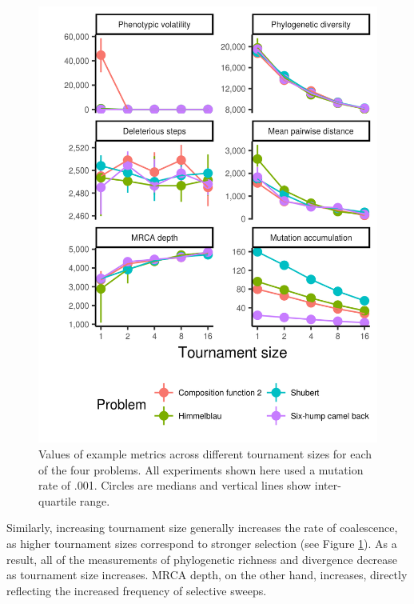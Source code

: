 \documentclass[letterpaper]{article}
\begin{document}
\begin{figure}
\includegraphics[width=7in]{figs/all_ts.png}
\caption{Values of example metrics across different tournament sizes for each of the four problems. All experiments shown here used a mutation rate of .001. Circles are medians and vertical lines show inter-quartile range.}
\label{fig:ts}
\end{figure}

Similarly, increasing tournament size generally increases the rate of coalescence, as higher tournament sizes correspond to stronger selection (see Figure \ref{fig:ts}). As a result, all of the measurements of phylogenetic richness and divergence decrease as tournament size increases. MRCA depth, on the other hand, increases, directly reflecting the increased frequency of selective sweeps. 
\end{document}
